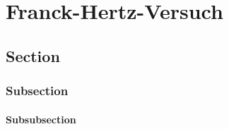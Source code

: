 \chapter{Franck-Hertz-Versuch}

\section{Section}
\subsection{Subsection}

\subsubsection{Subsubsection}
